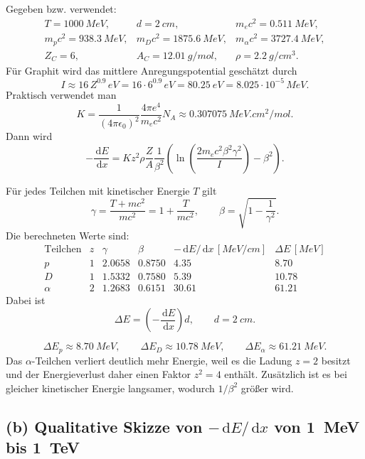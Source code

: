 \documentclass[11pt,a4paper]{scrartcl}
\newcommand{\paren}[1]{\left( #1 \right)}
\newcommand{\dd}{\,\mathrm{d}}
\newcommand{\dv}[2]{\frac{\dd #1}{\dd #2}}
\theoremstyle{definition}
\theoremstyle{plain}
\theoremstyle{remark}
\begin{document}
\begin{calculationbox}[title=Eingangsgr\"o\ss{}en]
Gegeben bzw. verwendet:
\[
\begin{array}{lll}
T=\SI{1000}{MeV}, & d=\SI{2}{cm}, & m_ec^2=\SI{0.511}{MeV},\\
 m_pc^2=\SI{938.3}{MeV}, & m_Dc^2=\SI{1875.6}{MeV}, & m_\alpha c^2=\SI{3727.4}{MeV},\\
 Z_C=6, & A_C=\SI{12.01}{g/mol}, & \rho=\SI{2.2}{g/cm^3}.
\end{array}
\]
F\"ur Graphit wird das mittlere Anregungspotential gesch\"atzt durch
\[
    I\approx 16\,Z^{0.9}\,\si{eV}=16\cdot 6^{0.9}\,\si{eV}=\SI{80.25}{eV}
    =8.025\cdot 10^{-5}\,\si{MeV}.
\]
Praktisch verwendet man
\[
    K=\frac{1}{(4\pi\epsilon_0)^2}\frac{4\pi e^4}{m_ec^2}N_A
    \approx \SI{0.307075}{MeV.cm^2/mol}.
\]
Dann wird
\[
    -\dv{E}{x}
    =Kz^2\rho\frac{Z}{A}\frac{1}{\beta^2}
    \paren{\ln\paren{\frac{2m_ec^2\beta^2\gamma^2}{I}}-\beta^2}.
\]
\end{calculationbox}

\begin{calculationbox}[title=Relativistische Kinematik]
F\"ur jedes Teilchen mit kinetischer Energie $T$ gilt
\[
    \gamma=\frac{T+mc^2}{mc^2}=1+\frac{T}{mc^2},
    \qquad
    \beta=\sqrt{1-\frac{1}{\gamma^2}}.
\]
Die berechneten Werte sind:
\[
\begin{array}{c|c|c|c|c|c}
\text{Teilchen} & z & \gamma & \beta & -\dd E/\dd x\,[\si{MeV/cm}] & \Delta E\,[\si{MeV}]\\
\hline
p & 1 & 2.0658 & 0.8750 & 4.35 & 8.70\\
D & 1 & 1.5332 & 0.7580 & 5.39 & 10.78\\
\alpha & 2 & 1.2683 & 0.6151 & 30.61 & 61.21
\end{array}
\]
Dabei ist
\[
    \Delta E=\paren{-\dv{E}{x}}d,
    \qquad d=\SI{2}{cm}.
\]
\end{calculationbox}

\begin{answerbox}
\[
    \boxed{\Delta E_p\approx\SI{8.70}{MeV}},
    \qquad
    \boxed{\Delta E_D\approx\SI{10.78}{MeV}},
    \qquad
    \boxed{\Delta E_\alpha\approx\SI{61.21}{MeV}}.
\]
Das $\alpha$-Teilchen verliert deutlich mehr Energie, weil es die Ladung $z=2$ besitzt und der Energieverlust daher einen Faktor $z^2=4$ enth\"alt. Zus\"atzlich ist es bei gleicher kinetischer Energie langsamer, wodurch $1/\beta^2$ gr\"o\ss{}er wird.
\end{answerbox}

\subsection*{(b) Qualitative Skizze von $-\dd E/\dd x$ von \SI{1}{MeV} bis \SI{1}{TeV}}
\end{document}
